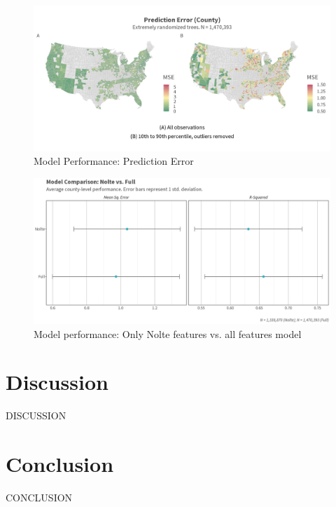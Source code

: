 \documentclass[12pt]{article}
\begin{document}
\begin{figure}
    \centering
    \includegraphics[width=6in]{figures/rf_mse_map.png}
    \caption{Model Performance: Prediction Error}
    \label{fig:mse_county}
\end{figure}

\newpage

\begin{figure}
    \centering
    \includegraphics[width=6in]{figures/nolte_full_compare.png}
    \caption{Model performance: Only Nolte features vs. all features model}
    \label{fig:nolte_full_compare}
\end{figure}

\newpage

\section{Discussion}

DISCUSSION

\newpage

\section{Conclusion}

CONCLUSION
\end{document}
